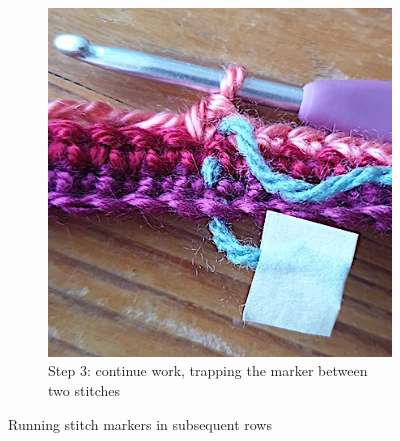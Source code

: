 \documentclass[openany]{book}
\begin{document}
\begin{figure}[H]
%
\begin{subfigure}[t]{.3\textwidth}
\includegraphics[width=.9\textwidth]{pic/Run3}
\caption{Step 3: continue work, trapping the marker between two stitches}
\end{subfigure}
\caption{Running stitch markers in subsequent rows}
\end{figure}

%
\end{document}

